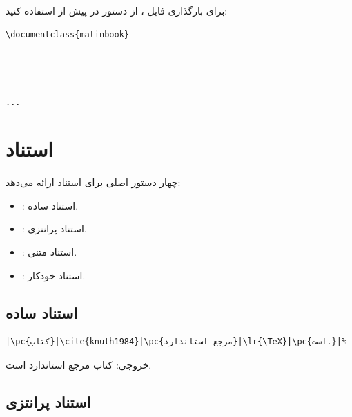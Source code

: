 برای بارگذاری فایل ، از دستور
 در پیش از
 استفاده کنید:

\begin{latin}
\begin{verbatim}
\documentclass{matinbook}




...

\end{verbatim}
\end{latin}


\section{استناد}
\label{sec:bibliography-citation}

 چهار دستور اصلی برای استناد ارائه
می‌دهد:

\begin{itemize}
    \item {}: استناد ساده.
    \item {}: استناد پرانتزی.
    \item {}: استناد متنی.
    \item {}: استناد خودکار.
\end{itemize}

\subsection{استناد ساده}
\label{sec:bibliography-cite}

\begin{latin}
\begin{verbatim}
|\pc{کتاب}|\cite{knuth1984}|\pc{مرجع استاندارد}|\lr{\TeX}|\pc{است.}|%
\end{verbatim}
\end{latin}

خروجی: کتاب \cite{knuth1984} مرجع استاندارد
\lr{\TeX} است.


\subsection{استناد پرانتزی}
\label{sec:bibliography-parencite}

